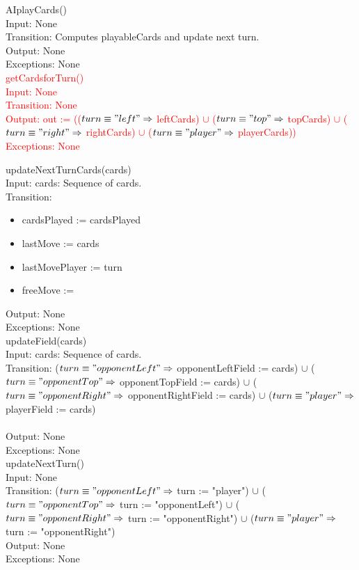 \documentclass[12pt, titlepage]{article}
\begin{document}
\noindent AIplayCards()\\
Input: None\\
Transition: Computes playableCards and update next turn.\\
Output: None\\
Exceptions: None \\


\noindent \textcolor{red}{getCardsforTurn()\\
Input: None\\
Transition: None \\
Output: out := (($turn \equiv "left" \Rightarrow$ leftCards) $\cup$ ($turn \equiv "top" \Rightarrow$ topCards) $\cup$ ($turn \equiv "right" \Rightarrow$ rightCards) $\cup$ ($turn \equiv "player" \Rightarrow$ playerCards))\\
Exceptions: None \\
}

\noindent  updateNextTurnCards(cards)\\
Input: cards: Sequence of cards.\\
Transition: 
\begin{itemize}
                \item cardsPlayed := cardsPlayed
                \item lastMove := cards
                \item lastMovePlayer := turn
                \item freeMove :=
\end{itemize}        
Output: None\\
Exceptions: None \\

\noindent updateField(cards)\\
Input: cards: Sequence of cards.\\
Transition: ($turn \equiv "opponentLeft" \Rightarrow$ opponentLeftField := cards) $\cup$ ($turn \equiv "opponentTop" \Rightarrow$ opponentTopField := cards) $\cup$ ($turn \equiv "opponentRight" \Rightarrow$ opponentRightField := cards) $\cup$ ($turn \equiv "player" \Rightarrow$ playerField := cards)\\\\
Output: None\\
Exceptions: None \\

\noindent updateNextTurn()  \\
Input: None\\
Transition: ($turn \equiv "opponentLeft" \Rightarrow$ turn := "player") $\cup$ ($turn \equiv "opponentTop" \Rightarrow$ turn := "opponentLeft") $\cup$ ($turn \equiv "opponentRight" \Rightarrow$ turn := "opponentRight") $\cup$ ($turn \equiv "player" \Rightarrow$ turn := "opponentRight")\\
Output: None\\
Exceptions: None \\
\end{document}
